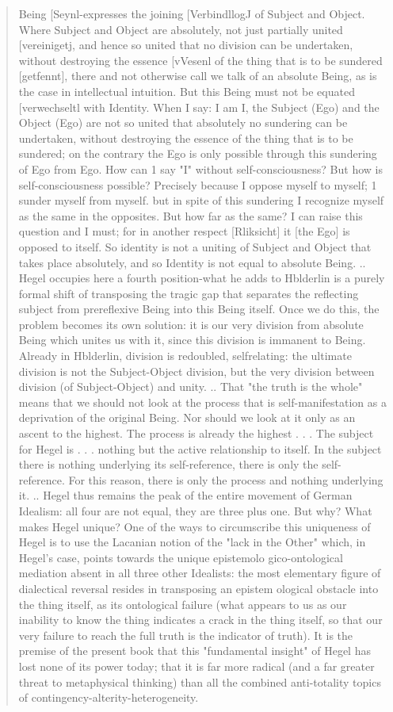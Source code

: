 \documentclass[10pt]{book}
\begin{document}
\begin{quotation}
Being [Seynl-expresses the joining [VerbindllogJ of Subject and Object. Where Subject and Object are absolutely, not just partially united [vereinigetj, and hence so united that no division can be undertaken, without destroying the essence [vVesenl of the thing that is to be sundered [getfennt], there and not otherwise call we talk of an absolute Being, as is the case in intellectual intuition.
But this Being must not be equated [verwechseltl with Identity. When I say: I am I, the Subject (Ego) and the Object (Ego) are not so united that absolutely no sundering can be undertaken, without destroying the essence of the thing that is to be sundered; on the contrary the Ego is only possible through this sundering of Ego from Ego. How can 1 say "I" without self-consciousness? But how is self-consciousness possible? Precisely because I oppose myself to myself; 1 sunder myself from myself. but in spite of this sundering I recognize myself as the same in the opposites. But how far as the same? I can raise this question and I must; for in another respect [Rliksicht] it [the Ego] is opposed to itself. So identity is not a uniting of Subject and Object that takes place absolutely, and so Identity is not equal to absolute Being.
..
Hegel occupies here a fourth position-what he adds to Hblderlin is a purely formal shift of transposing the tragic gap that separates the reflecting subject from prereflexive Being into this Being itself. Once we do this, the problem becomes its own solution: it is our very division from absolute Being which unites us with it, since this division is immanent to Being. Already in Hblderlin, division is redoubled, selfrelating: the ultimate division is not the Subject-Object division, but the very division between division (of Subject-Object) and unity. 
..
That "the truth is the whole" means that we should not look at the process that is self-manifestation as a deprivation of the original Being. Nor should we look at it only as an ascent to the highest. The process is already the highest . . . The subject for Hegel is . . . nothing but the active relationship to itself. In the subject there is nothing underlying its self-reference, there is only the self-reference. For this reason, there is only the process and nothing underlying it.
..
Hegel thus remains the peak of the entire movement of German Idealism: all four are not equal, they are three plus one. But why? What makes Hegel unique? One of the ways to circumscribe this uniqueness of Hegel is to use the Lacanian notion of the "lack in the Other" which, in Hegel's case, points towards the unique epistemolo gico-ontological mediation absent in all three other Idealists: the most elementary figure of dialectical reversal resides in transposing an epistem ological obstacle into the thing itself, as its ontological failure (what appears to us as our inability to know the thing indicates a crack in the thing itself, so that our very failure to reach the full truth is the indicator of truth). It is the premise of the present book that this "fundamental insight" of Hegel has lost none of its power today; that it is far more radical (and a far greater threat to metaphysical thinking) than all the combined anti-totality topics of contingency-alterity-heterogeneity.
\end{quotation}
\end{document}
